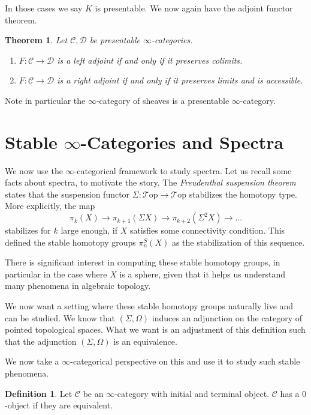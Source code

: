 \documentclass[10pt]{amsart}
\newcommand{\C}{\mathscr{C}}
\newcommand{\D}{\mathscr{D}}
\newcommand{\Top}{\mathscr{T}\mathrm{op}}
\newtheorem{theorem}[equation]{Theorem}
\theoremstyle{definition}
\newtheorem{definition}[equation]{Definition}
\theoremstyle{remark}
\begin{document}
In those cases we say $K$ is presentable. We now again have the adjoint functor theorem. 

\begin{theorem}
  Let $\C,\D$ be presentable $\infty$-categories.
  \begin{enumerate}
    \item $F\colon \C \to \D$ is a left adjoint if and only if it preserves colimits.
    \item $F\colon \C \to \D$ is a right adjoint if and only if it preserves limits and is accessible.
  \end{enumerate}
\end{theorem}

Note in particular the $\infty$-category of sheaves is a presentable $\infty$-category.

\section{Stable \texorpdfstring{$\infty$}{oo}-Categories and Spectra}
We now use the $\infty$-categorical framework to study spectra. Let us recall some facts about spectra, to motivate the story. The \emph{Freudenthal suspension theorem} states that the suspension functor $\Sigma \colon \Top \to \Top$ stabilizes the homotopy type. More explicitly, the map
\[
 \pi_k(X) \to \pi_{k+1}( \Sigma X) \to \pi_{k+2}(\Sigma^2X) \to ... 
\]
stabilizes for $k$ large enough, if $X$ satisfies some connectivity condition. This defined the stable homotopy groups $\pi_n^S(X)$ as the stabilization of this sequence.

There is significant interest in computing these stable homotopy groups, in particular in the case where $X$ is a sphere, given that it helps us understand many phenomena in algebraic topology.

We now want a setting where these stable homotopy groups naturally live and can be studied. We know that $(\Sigma,\Omega)$ induces an adjunction on the category of pointed topological spaces. What we want is an adjustment of this definition such that the adjunction $(\Sigma,\Omega)$  is an equivalence. 

We now take a $\infty$-categorical perspective on this and use it to study such stable phenomena. 

\begin{definition}
  Let $\C$ be an $\infty$-category with initial and terminal object. $\C$ has a $0$-object if they are equivalent.
\end{definition}
\end{document}
